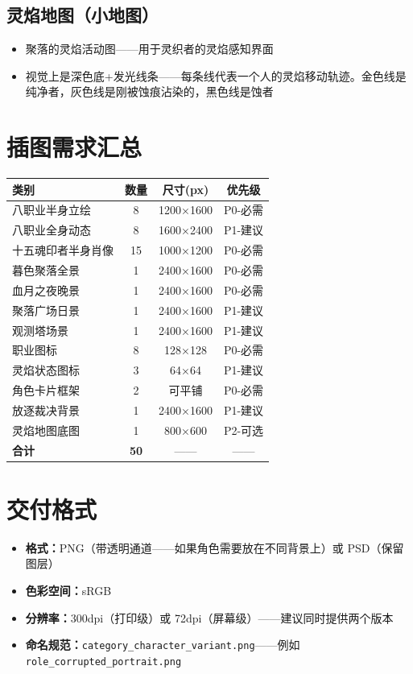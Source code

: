 \documentclass[12pt,a4paper,openany]{ctexbook}
\begin{document}
\section{灵焰地图（小地图）}
\begin{itemize}
    \item 聚落的灵焰活动图——用于灵织者的灵焰感知界面
    \item 视觉上是深色底+发光线条——每条线代表一个人的灵焰移动轨迹。金色线是纯净者，灰色线是刚被蚀痕沾染的，黑色线是蚀者
\end{itemize}

\chapter{插图需求汇总}

\begin{center}
\begin{tabular}{|l|c|c|c|}
\hline
\textbf{类别} & \textbf{数量} & \textbf{尺寸(px)} & \textbf{优先级} \\
\hline
八职业半身立绘 & 8 & 1200×1600 & P0-必需 \\
八职业全身动态 & 8 & 1600×2400 & P1-建议 \\
十五魂印者半身肖像 & 15 & 1000×1200 & P0-必需 \\
暮色聚落全景 & 1 & 2400×1600 & P0-必需 \\
血月之夜晚景 & 1 & 2400×1600 & P0-必需 \\
聚落广场日景 & 1 & 2400×1600 & P1-建议 \\
观测塔场景 & 1 & 2400×1600 & P1-建议 \\
职业图标 & 8 & 128×128 & P0-必需 \\
灵焰状态图标 & 3 & 64×64 & P1-建议 \\
角色卡片框架 & 2 & 可平铺 & P0-必需 \\
放逐裁决背景 & 1 & 2400×1600 & P1-建议 \\
灵焰地图底图 & 1 & 800×600 & P2-可选 \\
\hline
\textbf{合计} & \textbf{50} & —— & —— \\
\hline
\end{tabular}
\end{center}

\chapter{交付格式}

\begin{itemize}
    \item \textbf{格式：}PNG（带透明通道——如果角色需要放在不同背景上）或 PSD（保留图层）
    \item \textbf{色彩空间：}sRGB
    \item \textbf{分辨率：}300dpi（打印级）或 72dpi（屏幕级）——建议同时提供两个版本
    \item \textbf{命名规范：}\texttt{category\_character\_variant.png}——例如 \texttt{role\_corrupted\_portrait.png}
\end{itemize}
\end{document}
